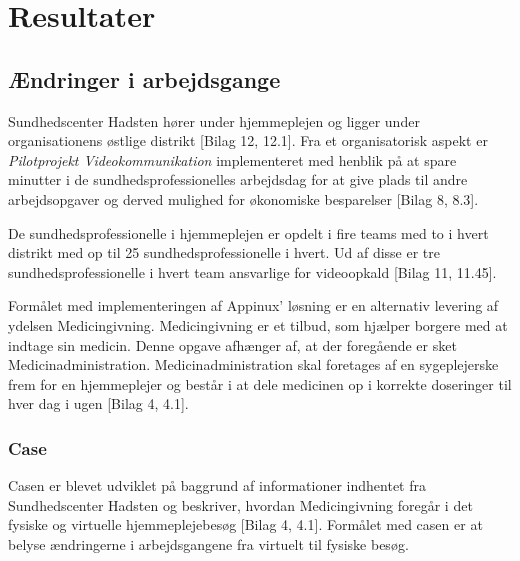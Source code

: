 \section{Resultater}
\subsection{Ændringer i arbejdsgange}\label{sec:arbejdsgange}
Sundhedscenter Hadsten hører under hjemmeplejen og ligger under organisationens østlige distrikt [Bilag 12, 12.1]. Fra et organisatorisk aspekt er \textit{Pilotprojekt Videokommunikation} implementeret med henblik på at spare minutter i de sundhedsprofessionelles arbejdsdag for at give plads til andre arbejdsopgaver og derved mulighed for økonomiske besparelser [Bilag 8, 8.3]. 

De sundhedsprofessionelle i hjemmeplejen er opdelt i fire teams med to i hvert distrikt med op til 25 sundhedsprofessionelle i hvert. Ud af disse er tre sundhedsprofessionelle i hvert team ansvarlige for videoopkald [Bilag 11, 11.45].

Formålet med implementeringen af Appinux’ løsning er en alternativ levering af ydelsen Medicingivning. Medicingivning er et tilbud, som hjælper borgere med at indtage sin medicin. Denne opgave afhænger af, at der foregående er sket Medicinadministration. Medicinadministration skal foretages af en sygeplejerske frem for en hjemmeplejer og består i at dele medicinen op i korrekte doseringer til hver dag i ugen [Bilag 4, 4.1].


\subsubsection{Case}
Casen er blevet udviklet på baggrund af informationer indhentet fra Sundhedscenter Hadsten og beskriver, hvordan Medicingivning foregår i det fysiske og virtuelle hjemmeplejebesøg [Bilag 4, 4.1].
Formålet med casen er at belyse ændringerne i arbejdsgangene fra virtuelt til fysiske besøg.

